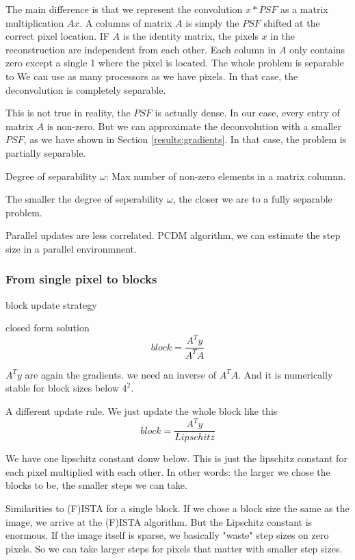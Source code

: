 The main difference is that we represent the convolution $x * PSF$ as a matrix multiplication $Ax$. A columns of matrix $A$ is simply the $PSF$ shifted at the correct pixel location. IF $A$ is the identity matrix, the pixels $x$ in the reconstruction are independent from each other. Each column in $A$ only contains zero except a single 1 where the pixel is located. The whole problem is separable to We can use as many processors as we have pixels. In that case, the deconvolution is completely separable.

This is not true in reality, the $PSF$ is actually dense. In our case, every entry of matrix $A$ is non-zero. But we can approximate the deconvolution with a smaller $PSF$, as we have shown in Section \ref{results:gradients}.  In that case, the problem is partially separable.

Degree of separability $\omega$:
Max number of non-zero elements in a matrix columnn.

The smaller the degree of seperability $\omega$, the closer we are to a fully separable problem. 

Parallel updates are less correlated. PCDM algorithm, we can estimate the step size in a parallel environmnent.
 

\subsubsection{From single pixel to blocks}
block update strategy

closed form solution
\begin{equation}
block = \frac{A^Ty}{A^TA}
\end{equation}

$A^Ty$ are again the gradients.
we need an inverse of $A^TA$. And it is numerically stable for block sizes below $4^2$. 

A different update rule. We just update the whole block like this
\begin{equation}
block = \frac{A^Ty}{Lipschitz}
\end{equation}

We have one lipschitz constant donw below. This is just the lipschitz constant for each pixel multiplied with each other. In other words: the larger we chose the blocks to be, the smaller steps we can take.

Similarities to (F)ISTA \cite{beck2009fista} for a single block.
If we chose a block size the same as the image, we arrive at the (F)ISTA algorithm.
But the Lipschitz constant is enormous. If the image itself is sparse, we basically "waste" step sizes on zero pixels. So we can take larger steps for pixels that matter with smaller step sizes.

